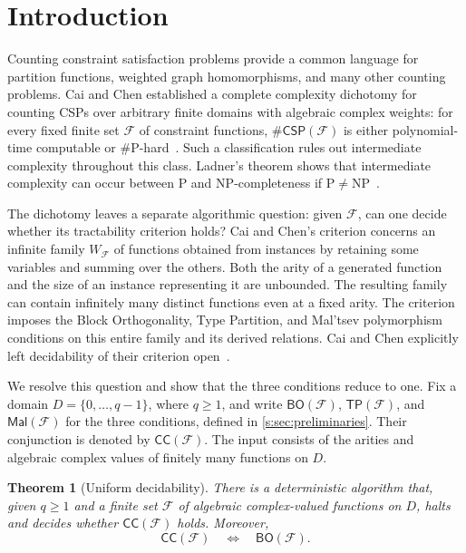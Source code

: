 \documentclass[11pt,letterpaper,onecolumn]{article}
\theoremstyle{plain}
\newtheorem{theorem}{Theorem}[section]
\theoremstyle{definition}
\theoremstyle{remark}
\newcommand{\cF}{\mathcal F}
\newcommand{\CC}{\mathsf{CC}}
\newcommand{\BO}{\mathsf{BO}}
\newcommand{\TP}{\mathsf{TP}}
\newcommand{\Mal}{\mathsf{Mal}}
\newcommand{\CSP}[1]{\mathsf{\#CSP}(#1)}
\begin{document}
\clearpage
{}
\hypersetup{pageanchor=true}
\section{Introduction}
\label{s:sec:introduction}

Counting constraint satisfaction problems provide a common language for
partition functions, weighted graph homomorphisms, and many other counting
problems. Cai and Chen established a complete complexity dichotomy for counting CSPs
over arbitrary finite domains with algebraic complex weights: for every
fixed finite set $\cF$ of constraint functions, $\CSP{\cF}$ is either
polynomial-time computable or $\#\mathrm P$-hard~\cite{CaiChen2017}.
Such a classification rules out intermediate complexity throughout this
class. Ladner's theorem shows that intermediate complexity can occur
between $\mathrm P$ and $\mathrm{NP}$-completeness if
$\mathrm P\ne\mathrm{NP}$~\cite{Ladner1975}.

The dichotomy leaves a separate algorithmic question: given $\cF$, can
one decide whether its tractability criterion holds? Cai and Chen's
criterion concerns an infinite family $W_{\cF}$ of functions obtained
from instances by retaining some variables and summing over the others.
Both the arity of a generated function and the size of an instance
representing it are unbounded. The resulting family can contain
infinitely many distinct functions even at a fixed arity.
The criterion imposes the Block
Orthogonality, Type Partition, and Mal'tsev polymorphism conditions on
this entire family and its derived relations. Cai and Chen explicitly left decidability
of their criterion open~\cite[Section~9]{CaiChen2017}.

We resolve this question and show that the three conditions reduce to
one. Fix a domain $D=\{0,\ldots,q-1\}$, where $q\ge1$, and write
$\BO(\cF)$, $\TP(\cF)$, and $\Mal(\cF)$ for the three conditions,
defined in \cref{s:sec:preliminaries}. Their conjunction is denoted by
$\CC(\cF)$. The input consists of the arities and algebraic complex
values of finitely many functions on $D$.

\begin{theorem}[Uniform decidability]
\label{s:thm:main}
There is a deterministic algorithm that, given $q\ge1$ and a finite set
$\cF$ of algebraic complex-valued functions on $D$, halts and decides
whether $\CC(\cF)$ holds. Moreover,
\[
  \CC(\cF)\quad\Longleftrightarrow\quad\BO(\cF).
\]
\end{theorem}
\end{document}
